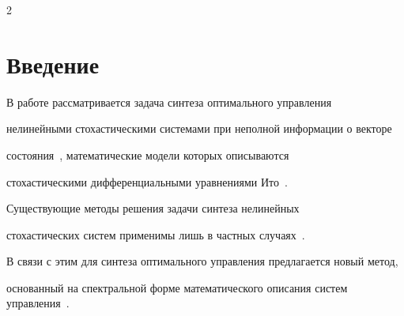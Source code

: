 









      \thispagestyle{headings}





      \begin{multicols}{2}


      


            \label{st\stat}








\section{Введение}





В работе рассматривается задача синтеза оптимального управления 


нелинейными стохастическими сис\-те\-мами при неполной информации о векторе 


состояния~\cite{PanBor, Pan_Synt}, математические модели которых описываются 


стохастическими дифференциальными уравнениями Ито~\cite{PugSin}.





Существующие методы решения задачи синтеза нелинейных 


стохастических систем применимы лишь в частных случаях~\cite{Pan_Synt}. 


В связи с этим для синтеза оптимального управления предлагается новый метод, 


основанный на спектральной форме математического описания систем управления~\cite{SolSem}.






\end{multicols}
